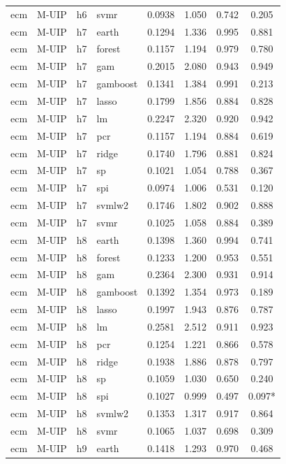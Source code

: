 \begin{ThreePartTable}
\begin{longtable}[t]{llclcccc}
ecm & M-UIP & h6 & svmr & 0.0938 & 1.050 & 0.742 & 0.205\\
\addlinespace
ecm & M-UIP & h7 & earth & 0.1294 & 1.336 & 0.995 & 0.881\\
ecm & M-UIP & h7 & forest & 0.1157 & 1.194 & 0.979 & 0.780\\
ecm & M-UIP & h7 & gam & 0.2015 & 2.080 & 0.943 & 0.949\\
ecm & M-UIP & h7 & gamboost & 0.1341 & 1.384 & 0.991 & 0.213\\
ecm & M-UIP & h7 & lasso & 0.1799 & 1.856 & 0.884 & 0.828\\
ecm & M-UIP & h7 & lm & 0.2247 & 2.320 & 0.920 & 0.942\\
ecm & M-UIP & h7 & pcr & 0.1157 & 1.194 & 0.884 & 0.619\\
ecm & M-UIP & h7 & ridge & 0.1740 & 1.796 & 0.881 & 0.824\\
ecm & M-UIP & h7 & sp & 0.1021 & 1.054 & 0.788 & 0.367\\
ecm & M-UIP & h7 & spi & 0.0974 & 1.006 & 0.531 & 0.120\\
ecm & M-UIP & h7 & svmlw2 & 0.1746 & 1.802 & 0.902 & 0.888\\
ecm & M-UIP & h7 & svmr & 0.1025 & 1.058 & 0.884 & 0.389\\
\addlinespace
ecm & M-UIP & h8 & earth & 0.1398 & 1.360 & 0.994 & 0.741\\
ecm & M-UIP & h8 & forest & 0.1233 & 1.200 & 0.953 & 0.551\\
ecm & M-UIP & h8 & gam & 0.2364 & 2.300 & 0.931 & 0.914\\
ecm & M-UIP & h8 & gamboost & 0.1392 & 1.354 & 0.973 & 0.189\\
ecm & M-UIP & h8 & lasso & 0.1997 & 1.943 & 0.876 & 0.787\\
ecm & M-UIP & h8 & lm & 0.2581 & 2.512 & 0.911 & 0.923\\
ecm & M-UIP & h8 & pcr & 0.1254 & 1.221 & 0.866 & 0.578\\
ecm & M-UIP & h8 & ridge & 0.1938 & 1.886 & 0.878 & 0.797\\
ecm & M-UIP & h8 & sp & 0.1059 & 1.030 & 0.650 & 0.240\\
ecm & M-UIP & h8 & spi & 0.1027 & 0.999 & 0.497 & 0.097*\\
ecm & M-UIP & h8 & svmlw2 & 0.1353 & 1.317 & 0.917 & 0.864\\
ecm & M-UIP & h8 & svmr & 0.1065 & 1.037 & 0.698 & 0.309\\
\addlinespace
ecm & M-UIP & h9 & earth & 0.1418 & 1.293 & 0.970 & 0.468\\

\end{longtable}
\end{ThreePartTable}
